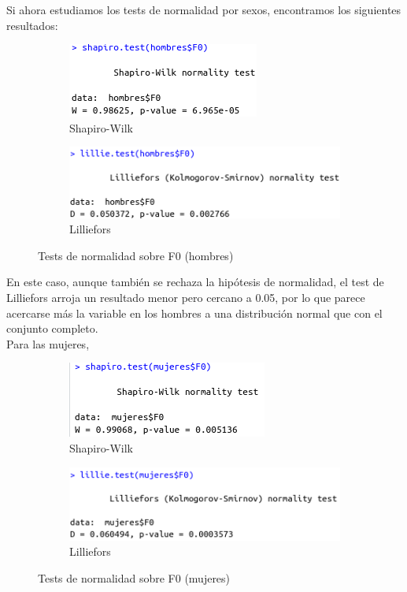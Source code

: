 Si ahora estudiamos los tests de normalidad por sexos, encontramos los siguientes resultados:

\begin{figure}[H]
	\centering
	\begin{subfigure}{.5\textwidth}
		\centering
		\includegraphics[width=.6\linewidth]{swh-F0.png}
		\caption{Shapiro-Wilk}
		\label{fig:swh-F0}
	\end{subfigure}%
	\begin{subfigure}{.5\textwidth}
		\centering
		\includegraphics[width=.6\linewidth]{lh-F0.png}
		\caption{Lilliefors}
		\label{fig:lh-F0}
	\end{subfigure}
	\caption{Tests de normalidad sobre F0 (hombres)}
	\label{fig:normhF0}
\end{figure}

En este caso, aunque también se rechaza la hipótesis de normalidad, el test de Lilliefors arroja un resultado menor pero cercano a 0.05, por lo que parece acercarse más la variable en los hombres a una distribución normal que con el conjunto completo. \\

Para las mujeres,

\begin{figure}[H]
	\centering
	\begin{subfigure}{.5\textwidth}
		\centering
		\includegraphics[width=.6\linewidth]{swm-F0.png}
		\caption{Shapiro-Wilk}
		\label{fig:swm-F0}
	\end{subfigure}%
	\begin{subfigure}{.5\textwidth}
		\centering
		\includegraphics[width=.6\linewidth]{lm-F0.png}
		\caption{Lilliefors}
		\label{fig:lm-F0}
	\end{subfigure}
	\caption{Tests de normalidad sobre F0 (mujeres)}
	\label{fig:normmF0}
\end{figure}


